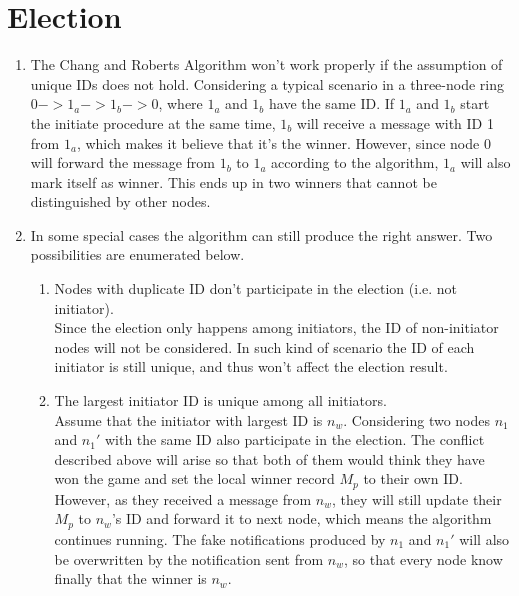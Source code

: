 \documentclass[a4paper, 14pt]{article}
\begin{document}
\section{Election}
\begin{enumerate}
\item The Chang and Roberts Algorithm won't work properly if the assumption of unique IDs does not hold. Considering a typical scenario in a three-node ring $0->1_a->1_b->0$, where $1_a$ and $1_b$ have the same ID.
If $1_a$ and $1_b$ start the initiate procedure at the same time, $1_b$ will receive a message with ID 1 from $1_a$, which makes it believe that it's the winner. However, since node $0$ will forward the message from $1_b$ to $1_a$ according to the algorithm, $1_a$ will also mark itself as winner. This ends up in two winners that cannot be distinguished by other nodes.

\item In some special cases the algorithm can still produce the right answer. Two possibilities are enumerated below.
\begin{enumerate}
	\item Nodes with duplicate ID don't participate in the election (i.e. not initiator).\\
	Since the election only happens among initiators, the ID of non-initiator nodes will not be considered. In such kind of scenario the ID of each initiator is still unique, and thus won't affect the election result.
	
	\item The largest initiator ID is unique among all initiators. \\
	Assume that the initiator with largest ID is $n_w$. Considering two nodes $n_1$ and $n_1'$ with the same ID also participate in the election. The conflict described above will arise so that both of them would think they have won the game and set the local winner record $M_p$ to their own ID. However, as they received a message from $n_w$, they will still update their $M_p$ to $n_w$'s ID and forward it to next node, which means the algorithm continues running. The fake notifications produced by $n_1$ and $n_1'$ will also be overwritten by the notification sent from $n_w$, so that every node know finally that the winner is $n_w$. 
\end{enumerate}
\end{enumerate}
\end{document}
